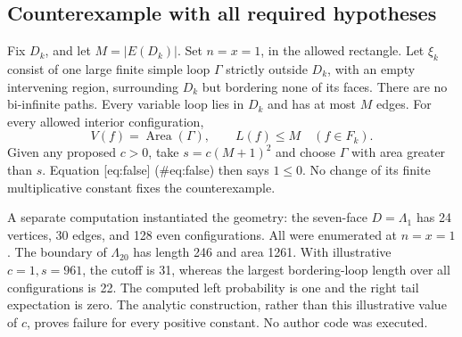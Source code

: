 \documentclass[10pt]{article}
\begin{document}
\subsection*{Counterexample with all required hypotheses}
Fix \(D_k\), and let \(M=|E(D_k)|\). Set \(n=x=1\), in the allowed rectangle. Let \(\xi_k\) consist of one large finite simple loop \(\Gamma\) strictly outside \(D_k\), with an empty intervening region, surrounding \(D_k\) but bordering none of its faces. There are no bi-infinite paths. Every variable loop lies in \(D_k\) and has at most \(M\) edges. For every allowed interior configuration, \[V(f)=\operatorname{Area}(\Gamma),\qquad L(f)\le M\quad(f\in F_k).\] Given any proposed \(c>0\), take \(s=c(M+1)^2\) and choose \(\Gamma\) with area greater than \(s\). Equation [eq:false] (\#eq:false) then says \(1\le0\). No change of its finite multiplicative constant fixes the counterexample.\par
A separate computation instantiated the geometry: the seven-face \(D=\Lambda_1\) has 24 vertices, 30 edges, and 128 even configurations. All were enumerated at \(n=x=1\). The boundary of \(\Lambda_{20}\) has length 246 and area 1261. With illustrative \(c=1,s=961\), the cutoff is 31, whereas the largest bordering-loop length over all configurations is 22. The computed left probability is one and the right tail expectation is zero. The analytic construction, rather than this illustrative value of \(c\), proves failure for every positive constant. No author code was executed.\par
\end{document}
